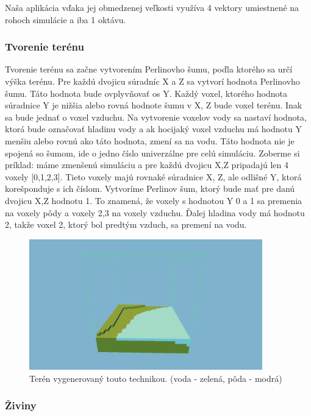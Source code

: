 \documentclass[12pt]{article}
\begin{document}
Naša aplikácia vďaka jej obmedzenej veľkosti využíva 4 vektory umiestnené
na rohoch simulácie a iba 1 oktávu.

\subsubsection{Tvorenie terénu}

Tvorenie terénu sa začne vytvorením Perlinovho šumu, poďla ktorého sa určí výška terénu.
Pre každú dvojicu súradníc X a Z sa vytvorí hodnota Perlinovho šumu. Táto hodnota
bude ovplyvňovať os Y. Každý voxel, ktorého hodnota súradnice Y je nižšia alebo
rovná hodnote šumu v X, Z bude voxel terénu. Inak sa bude jednať o voxel
vzduchu. Na vytvorenie voxelov vody sa nastaví hodnota, ktorá bude označovať
hladinu vody a ak hocijaký voxel vzduchu má hodnotu Y menšiu alebo rovnú ako táto
hodnota, zmení sa na vodu. Táto hodnota nie je spojená so šumom, ide o jedno
číslo univerzálne pre celú simuláciu. Zoberme si príklad: máme zmenšenú
simuláciu a pre každú dvojicu X,Z pripadajú len 4 voxely [0,1,2,3]. Tieto voxely
majú rovnaké súradnice X, Z, ale odlišné Y, ktorá korešponduje s ich číslom.
Vytvoríme Perlinov šum, ktorý bude mať pre danú dvojicu X,Z hodnotu 1. To
znamená, že voxely s hodnotou Y 0 a 1 sa premenia na voxely pôdy a voxely 2,3
na voxely vzduchu. Ďalej hladina vody má hodnotu 2, takže voxel 2, ktorý bol
predtým vzduch, sa premení na vodu.

\begin{figure}[ht]
	\centering
	\includegraphics[width=0.9\textwidth]{res/terrain.png}
	\caption{Terén vygenerovaný touto technikou. (voda - zelená, pôda - modrá)}
\end{figure}

\subsubsection{Živiny}
\end{document}
